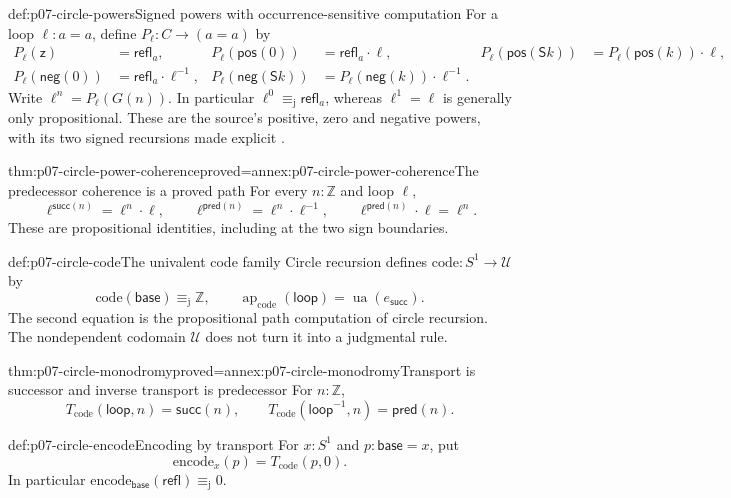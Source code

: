 \begin{hbdefinition}{def:p07-circle-powers}{Signed powers with occurrence-sensitive computation}
For a loop \(\ell:a=a\), define \(P_\ell:C\to(a=a)\) by
\[
\begin{aligned}
P_\ell(\mathsf z)&=\mathsf{refl}_a,&
P_\ell(\mathsf{pos}(0))&=\mathsf{refl}_a\cdot\ell,&
P_\ell(\mathsf{pos}(\mathsf Sk))&=P_\ell(\mathsf{pos}(k))\cdot\ell,\\
P_\ell(\mathsf{neg}(0))&=\mathsf{refl}_a\cdot\ell^{-1},&
P_\ell(\mathsf{neg}(\mathsf Sk))&=P_\ell(\mathsf{neg}(k))\cdot\ell^{-1}.
\end{aligned}
\]
Write \(\ell^n=P_\ell(G(n))\). In particular
\(\ell^0\equiv_{\mathrm j}\mathsf{refl}_a\), whereas
\(\ell^1=\ell\) is generally only propositional. These are the source's
positive, zero and negative powers, with its two signed recursions made
explicit \cite[\S6.10; \S8.1]{HoTT2013PublicReleaseFoundations}.
\end{hbdefinition}

\begin{hblemma}{thm:p07-circle-power-coherence}{proved=annex:p07-circle-power-coherence}{The predecessor coherence is a proved path}
For every \(n:\mathbb Z\) and loop \(\ell\),
\[
\ell^{\mathsf{succ}(n)}=\ell^n\cdot\ell,\qquad
\ell^{\mathsf{pred}(n)}=\ell^n\cdot\ell^{-1},\qquad
\ell^{\mathsf{pred}(n)}\cdot\ell=\ell^n.
\]
These are propositional identities, including at the two sign boundaries.
\end{hblemma}

\begin{hbdefinition}{def:p07-circle-code}{The univalent code family}
Circle recursion defines \(\mathrm{code}:S^1\to\mathcal U\) by
\[
\mathrm{code}(\mathsf{base})\equiv_{\mathrm j}\mathbb Z,\qquad
\operatorname{ap}_{\mathrm{code}}(\mathsf{loop})
 =\operatorname{ua}(e_{\mathsf{succ}}).
\]
The second equation is the propositional path computation of circle recursion.
The nondependent codomain \(\mathcal U\) does not turn it into a judgmental rule.
\end{hbdefinition}

\begin{hblemma}{thm:p07-circle-monodromy}{proved=annex:p07-circle-monodromy}{Transport is successor and inverse transport is predecessor}
For \(n:\mathbb Z\),
\[
T_{\mathrm{code}}(\mathsf{loop},n)=\mathsf{succ}(n),\qquad
T_{\mathrm{code}}(\mathsf{loop}^{-1},n)=\mathsf{pred}(n).
\]
\end{hblemma}

\begin{hbdefinition}{def:p07-circle-encode}{Encoding by transport}
For \(x:S^1\) and \(p:\mathsf{base}=x\), put
\[
\mathrm{encode}_x(p)=T_{\mathrm{code}}(p,0).
\]
In particular \(\mathrm{encode}_{\mathsf{base}}(\mathsf{refl})
\equiv_{\mathrm j}0\).
\end{hbdefinition}

